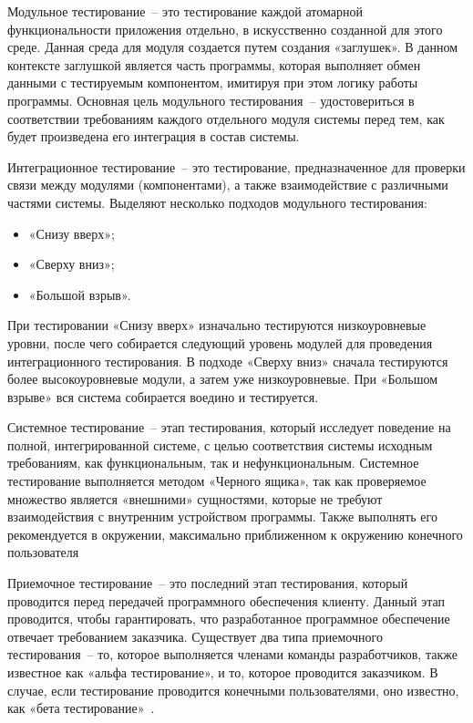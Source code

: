 Модульное тестирование~-- это тестирование каждой атомарной 
функциональности приложения отдельно, в искусственно созданной для этого 
среде. Данная среда для модуля создается путем создания «заглушек». В 
данном контексте заглушкой является часть программы, которая выполняет 
обмен данными с тестируемым компонентом, имитируя при этом логику 
работы программы. Основная цель модульного тестирования~--
удостовериться в соответствии требованиям каждого отдельного модуля 
системы перед тем, как будет произведена его интеграция в состав системы.

Интеграционное тестирование~-- это тестирование, предназначенное для 
проверки связи между модулями (компонентами), а также взаимодействие с 
различными частями системы. Выделяют несколько подходов модульного 
тестирования: 
\begin{itemize}
    \item «Снизу вверх»;
    \item «Сверху вниз»;
    \item «Большой взрыв».
\end{itemize}

При тестировании «Снизу вверх» изначально тестируются низкоуровневые 
уровни, после чего собирается следующий уровень модулей для проведения 
интеграционного тестирования. В подходе «Сверху вниз» сначала 
тестируются более высокоуровневые модули, а затем уже низкоуровневые. 
При «Большом взрыве» вся система собирается воедино и тестируется.

Системное тестирование~-- этап тестирования, который исследует 
поведение на полной, интегрированной системе, с целью соответствия 
системы исходным требованиям, как функциональным, так и 
нефункциональным. Системное тестирование выполняется методом «Черного 
ящика», так как проверяемое множество является «внешними» сущностями, 
которые не требуют взаимодействия с внутренним устройством программы. 
Также выполнять его рекомендуется в окружении, максимально 
приближенном к окружению конечного пользователя

Приемочное тестирование~-- это последний этап тестирования, который 
проводится перед передачей программного обеспечения клиенту. Данный этап 
проводится, чтобы гарантировать, что разработанное программное 
обеспечение отвечает требованием заказчика. Существует два типа 
приемочного тестирования~-- то, которое выполняется членами команды 
разработчиков, также известное как «альфа тестирование», и то, которое 
проводится заказчиком. В случае, если тестирование проводится конечными 
пользователями, оно известно, как «бета тестирование»~\cite{testing_epam}.

